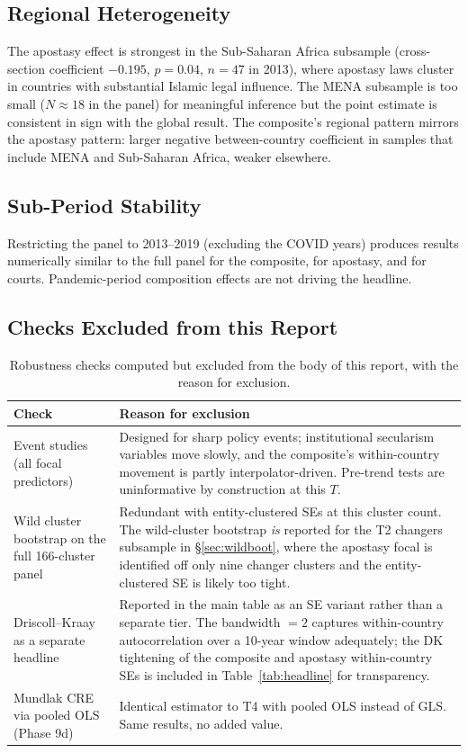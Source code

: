 \documentclass[12pt,a4paper]{article}
\begin{document}
\subsection{Regional Heterogeneity}

The apostasy effect is strongest in the Sub-Saharan Africa subsample (cross-section coefficient $-0.195$, $p = 0.04$, $n = 47$ in 2013), where apostasy laws cluster in countries with substantial Islamic legal influence. The MENA subsample is too small ($N \approx 18$ in the panel) for meaningful inference but the point estimate is consistent in sign with the global result. The composite's regional pattern mirrors the apostasy pattern: larger negative between-country coefficient in samples that include MENA and Sub-Saharan Africa, weaker elsewhere.

\subsection{Sub-Period Stability}

Restricting the panel to 2013--2019 (excluding the COVID years) produces results numerically similar to the full panel for the composite, for apostasy, and for courts. Pandemic-period composition effects are not driving the headline.

\subsection{Checks Excluded from this Report}

\begin{table}[H]
\centering
\caption{Robustness checks computed but excluded from the body of this report, with the reason for exclusion.}
\label{tab:dropped}
\begin{tabular}{p{}p{}}
\toprule
Check & Reason for exclusion \\
\midrule
Event studies (all focal predictors) & Designed for sharp policy events; institutional secularism variables move slowly, and the composite's within-country movement is partly interpolator-driven. Pre-trend tests are uninformative by construction at this $T$. \\
Wild cluster bootstrap on the full 166-cluster panel & Redundant with entity-clustered SEs at this cluster count. The wild-cluster bootstrap \emph{is} reported for the T2 changers subsample in \S\ref{sec:wildboot}, where the apostasy focal is identified off only nine changer clusters and the entity-clustered SE is likely too tight. \\
Driscoll--Kraay as a separate headline & Reported in the main table as an SE variant rather than a separate tier. The bandwidth $= 2$ captures within-country autocorrelation over a 10-year window adequately; the DK tightening of the composite and apostasy within-country SEs is included in Table~\ref{tab:headline} for transparency. \\
Mundlak CRE via pooled OLS (Phase 9d) & Identical estimator to T4 with pooled OLS instead of GLS. Same results, no added value. \\
\bottomrule
\end{tabular}
\end{table}


\end{document}
